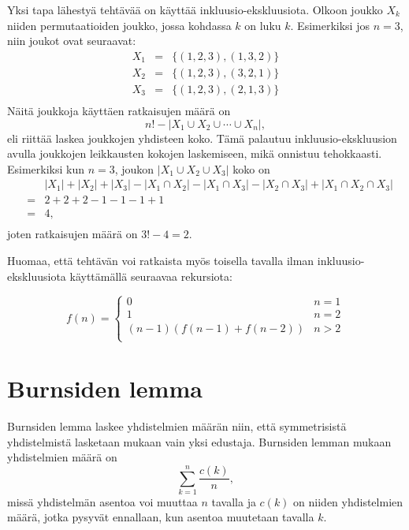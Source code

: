 Yksi tapa lähestyä tehtävää on käyttää inkluusio-ekskluusiota.
Olkoon joukko $X_k$ niiden permutaatioiden joukko,
jossa kohdassa $k$ on luku $k$.
Esimerkiksi jos $n=3$, niin joukot ovat seuraavat:
\[
\begin{array}{lcl}
X_1 & = & \{(1,2,3),(1,3,2)\} \\
X_2 & = & \{(1,2,3),(3,2,1)\} \\
X_3 & = & \{(1,2,3),(2,1,3)\} \\
\end{array}
\]
Näitä joukkoja käyttäen ratkaisujen määrä on
\[ n! - |X_1 \cup X_2 \cup \cdots \cup X_n|, \]
eli
riittää laskea joukkojen yhdisteen koko.
Tämä palautuu inkluusio-eks\-kluu\-sion avulla
joukkojen leikkausten kokojen laskemiseen,
mikä onnistuu tehokkaasti.
Esimerkiksi kun $n=3$, joukon $|X_1 \cup X_2 \cup X_3|$ koko on
\[
\begin{array}{lcl}
 & & |X_1| + |X_2| + |X_3| - |X_1 \cap X_2|  - |X_1 \cap X_3|  - |X_2 \cap X_3| + |X_1 \cap X_2 \cap X_3| \\
 & = & 2+2+2-1-1-1+1 \\
 & = & 4, \\
\end{array}
\]
joten ratkaisujen määrä on $3!-4=2$.

Huomaa, että tehtävän voi ratkaista myös toisella
tavalla ilman inkluusio-ekskluusiota
käyttämällä seuraavaa rekursiota:

\begin{equation*}
    f(n) = \begin{cases}
               0               & n = 1\\
               1               & n = 2\\
               (n-1)(f(n-1) + f(n-2)) & n>2 \\
           \end{cases}
\end{equation*}

\section{Burnsiden lemma}

Burnsiden lemma laskee yhdistelmien määrän niin,
että symmetrisistä yhdistelmistä lasketaan
mukaan vain yksi edustaja.
Burnsiden lemman mukaan yhdistelmien määrä on
\[\sum_{k=1}^n \frac{c(k)}{n},\]
missä yhdistelmän asentoa voi muuttaa $n$ tavalla
ja $c(k)$ on niiden yhdistelmien määrä,
jotka pysyvät ennallaan, kun asentoa
muutetaan tavalla $k$.

